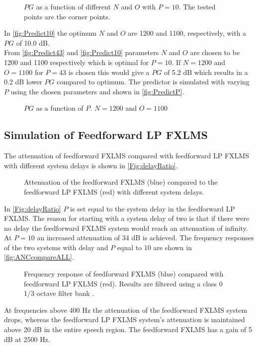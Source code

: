 \begin{figure}[H]
	\centering
	
	\caption{$PG$ as a function of different $N$ and $O$ with $P=10$. The tested points are the corner points.}
	\label{fig:Predict10}
\end{figure}
In \autoref{fig:Predict10} the optimum $N$ and $O$ are 1200 and 1100, respectively, with a $PG$ of 10.0 dB.\\

From \autoref{fig:Predict43} and \autoref{fig:Predict10} parameters $N$ and $O$ are chosen to be 1200 and 1100 respectively which is optimal for $P=10$. If $N=1200$ and $O=1100$ for $P=43$ is chosen this would give a $PG$ of 5.2 dB which results in a 0.2 dB lower $PG$ compared to optimum.
The predictor is simulated with varying $P$ using the chosen parameters and shown in \autoref{fig:PredictP}.

\begin{figure}[H]
	\centering
	
	\caption{$PG$ as a function of $P$. $N=1200$ and $O=1100$}
	\label{fig:PredictP}
\end{figure}



\subsection{Simulation of Feedforward LP FXLMS}
The attenuation of feedforward FXLMS compared with feedforward LP FXLMS with different system delays is shown in \autoref{Fig:delayRatio}.
\begin{figure}[H]
	\centering
	
	\caption{Attenuation of the feedforward FXLMS (blue)  compared to the feedforward LP FXLMS (red) with different system delays.}
	\label{Fig:delayRatio}
\end{figure}
In \autoref{Fig:delayRatio} $P$ is set equal to the system delay in the feedforward LP FXLMS. The reason for starting with a system delay of two is that if there were no delay the feedforward FXLMS system would reach an attenuation of infinity. At $P=10$ an increased attenuation of 34 dB is achieved. The frequency responses of the two systems with delay and $P$ equal to 10 are shown in \autoref{fig:ANCcompareALL}.  

\begin{figure}[H]
	\centering
	
	\caption{Frequency response of feedforward FXLMS (blue) compared with feedforward LP FXLMS (red). Results are filtered using a class 0 1/3 octave filter bank \cite{OctaveBand}.}
	\label{fig:ANCcompareALL}
\end{figure}        
At frequencies above 400 Hz the attenuation of the feedforward FXLMS system drops, whereas the feedforward LP FXLMS system's attenuation is maintained above 20 dB in the entire speech region. The feedforward FXLMS has a gain of 5 dB at 2500 Hz.  
        




